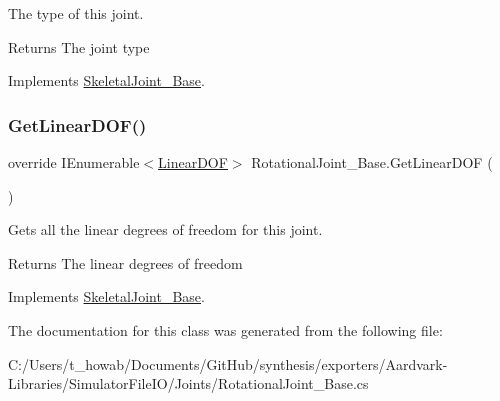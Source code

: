 The type of this joint. 

\begin{DoxyReturn}{Returns}
The joint type
\end{DoxyReturn}


Implements \hyperlink{class_skeletal_joint___base_aee155cbd483cb512bf3fc0f9a8885335}{Skeletal\+Joint\+\_\+\+Base}.

\mbox{\label{class_rotational_joint___base_a887b07a072831dd6af60ded53e3a461e}} 
\subsubsection{\texorpdfstring{Get\+Linear\+D\+O\+F()}{GetLinearDOF()}}
{\footnotesize\ttfamily override I\+Enumerable$<$\hyperlink{interface_linear_d_o_f}{Linear\+D\+OF}$>$ Rotational\+Joint\+\_\+\+Base.\+Get\+Linear\+D\+OF (\begin{DoxyParamCaption}{ }\end{DoxyParamCaption})\hspace{0.3cm}{\ttfamily [virtual]}}



Gets all the linear degrees of freedom for this joint. 

\begin{DoxyReturn}{Returns}
The linear degrees of freedom
\end{DoxyReturn}


Implements \hyperlink{class_skeletal_joint___base_a14564d8c44dfeef8b7a10044f2392cde}{Skeletal\+Joint\+\_\+\+Base}.



The documentation for this class was generated from the following file\+:\begin{DoxyCompactItemize}
\item 
C\+:/\+Users/t\+\_\+howab/\+Documents/\+Git\+Hub/synthesis/exporters/\+Aardvark-\/\+Libraries/\+Simulator\+File\+I\+O/\+Joints/Rotational\+Joint\+\_\+\+Base.\+cs\end{DoxyCompactItemize}
